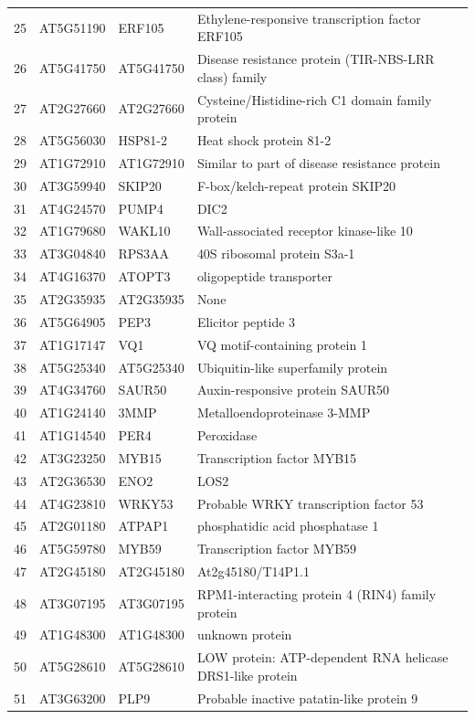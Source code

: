 \documentclass[11pt]{article}
\begin{document}
\begin{center}
\begin{tabular}{rlll}
25 & AT5G51190 & ERF105 & Ethylene-responsive transcription factor ERF105\\
26 & AT5G41750 & AT5G41750 & Disease resistance protein (TIR-NBS-LRR class) family\\
27 & AT2G27660 & AT2G27660 & Cysteine/Histidine-rich C1 domain family protein\\
28 & AT5G56030 & HSP81-2 & Heat shock protein 81-2\\
29 & AT1G72910 & AT1G72910 & Similar to part of disease resistance protein\\
30 & AT3G59940 & SKIP20 & F-box/kelch-repeat protein SKIP20\\
31 & AT4G24570 & PUMP4 & DIC2\\
32 & AT1G79680 & WAKL10 & Wall-associated receptor kinase-like 10\\
33 & AT3G04840 & RPS3AA & 40S ribosomal protein S3a-1\\
34 & AT4G16370 & ATOPT3 & oligopeptide transporter\\
35 & AT2G35935 & AT2G35935 & None\\
36 & AT5G64905 & PEP3 & Elicitor peptide 3\\
37 & AT1G17147 & VQ1 & VQ motif-containing protein 1\\
38 & AT5G25340 & AT5G25340 & Ubiquitin-like superfamily protein\\
39 & AT4G34760 & SAUR50 & Auxin-responsive protein SAUR50\\
40 & AT1G24140 & 3MMP & Metalloendoproteinase 3-MMP\\
41 & AT1G14540 & PER4 & Peroxidase\\
42 & AT3G23250 & MYB15 & Transcription factor MYB15\\
43 & AT2G36530 & ENO2 & LOS2\\
44 & AT4G23810 & WRKY53 & Probable WRKY transcription factor 53\\
45 & AT2G01180 & ATPAP1 & phosphatidic acid phosphatase 1\\
46 & AT5G59780 & MYB59 & Transcription factor MYB59\\
47 & AT2G45180 & AT2G45180 & At2g45180/T14P1.1\\
48 & AT3G07195 & AT3G07195 & RPM1-interacting protein 4 (RIN4) family protein\\
49 & AT1G48300 & AT1G48300 & unknown protein\\
50 & AT5G28610 & AT5G28610 & LOW protein: ATP-dependent RNA helicase DRS1-like protein\\
51 & AT3G63200 & PLP9 & Probable inactive patatin-like protein 9\\

\end{tabular}
\end{center}
\end{document}
